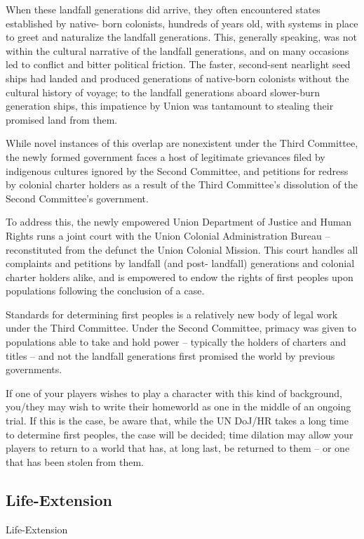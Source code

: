 When these landfall generations did arrive, they often encountered states established by native- 
born colonists, hundreds of years old, with systems in place to greet and naturalize the landfall  
generations. This, generally speaking, was not within the cultural narrative of the landfall  
generations, and on many occasions led to conflict and bitter political friction. The faster,  
second-sent nearlight seed ships had landed and produced generations of native-born colonists  
without the cultural history of voyage; to the landfall generations aboard slower-burn generation  
ships, this impatience by Union was tantamount to stealing their promised land from them. 
 

While novel instances of this overlap are nonexistent under the Third Committee, the newly  
formed government faces a host of legitimate grievances filed by indigenous cultures ignored by  
the Second Committee, and petitions for redress by colonial charter holders as a result of the  
Third Committee’s dissolution of the Second Committee’s government. 
 

To address this, the newly empowered Union Department of Justice and Human Rights runs a  
joint court with the Union Colonial Administration Bureau -- reconstituted from the defunct the  
Union Colonial Mission. This court handles all complaints and petitions by landfall (and post- 
landfall) generations and colonial charter holders alike, and is empowered to endow the rights of  
first peoples upon populations following the conclusion of a case. 
 

Standards for determining first peoples is a relatively new body of legal work under the Third  
Committee. Under the Second Committee, primacy was given to populations able to take and  
hold power -- typically the holders of charters and titles -- and not the landfall generations first  
promised the world by previous governments.    

If one of your players wishes to play a character with this kind of background, you/they may wish  
to write their homeworld as one in the middle of an ongoing trial. If this is the case, be aware  
that, while the UN DoJ/HR takes a long time to determine first peoples, the case will be decided;  
time dilation may allow your players to return to a world that has, at long last, be returned to  
them -- or one that has been stolen from them.   
\subsection{Life-Extension}
Life-Extension  


